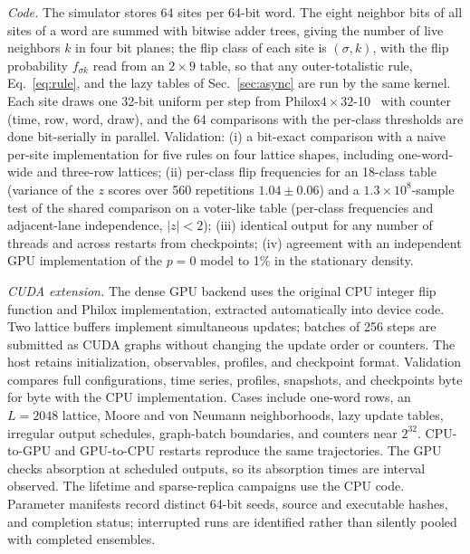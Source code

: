 \documentclass[pre,twocolumn,superscriptaddress,showpacs,floatfix]{revtex4-2}
\begin{document}
\textit{Code.} The simulator stores 64 sites per 64-bit word. The eight neighbor bits of all sites
of a word are summed with bitwise adder trees, giving the number of live neighbors $k$ in four
bit planes; the flip class of each site is $(\sigma, k)$, with the flip probability $f_{\sigma k}$
read from an $2\times 9$ table, so that any outer-totalistic rule, Eq.~\eqref{eq:rule}, and the lazy
tables of Sec.~\ref{sec:async} are run by the same kernel. Each site draws one 32-bit uniform per
step from Philox$4\times32$-10~\cite{salmon2011} with counter (time, row, word, draw), and the 64
comparisons with the per-class thresholds are done bit-serially in parallel. Validation: (i) a
bit-exact comparison with a naive per-site implementation for five rules on four lattice shapes,
including one-word-wide and three-row lattices; (ii) per-class flip frequencies for an 18-class
table (variance of the $z$ scores over 560 repetitions $1.04\pm0.06$) and a $1.3\times10^8$-sample
test of the shared comparison on a voter-like table (per-class frequencies and adjacent-lane
independence, $|z|<2$); (iii) identical output for any number of threads and across restarts
from checkpoints; (iv) agreement with an independent GPU implementation of the $p = 0$ model to
1\% in the stationary density.

\textit{CUDA extension.} The dense GPU backend uses the original CPU integer
flip function and Philox implementation, extracted automatically into device
code. Two lattice buffers implement simultaneous updates; batches of 256 steps
are submitted as CUDA graphs without changing the update order or counters.
The host retains initialization, observables, profiles, and checkpoint format.
Validation compares full configurations, time series, profiles, snapshots, and
checkpoints byte for byte with the CPU implementation. Cases include one-word
rows, an $L=2048$ lattice, Moore and von Neumann neighborhoods, lazy update
tables, irregular output schedules, graph-batch boundaries, and counters near
$2^{32}$. CPU-to-GPU and GPU-to-CPU restarts reproduce the same trajectories.
The GPU checks absorption at scheduled outputs, so its absorption times are
interval observed. The lifetime and sparse-replica campaigns use the CPU code.
Parameter manifests record distinct 64-bit seeds, source and executable hashes,
and completion status; interrupted runs are identified rather than silently
pooled with completed ensembles.
\end{document}
